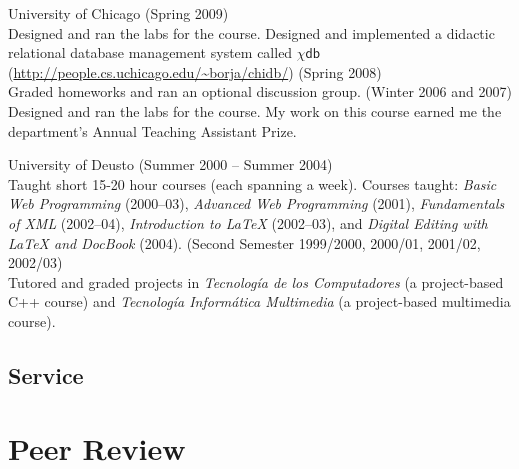 \documentclass{resume}
\begin{document}
\begin{category}{University of Chicago} 
 (Spring 2009)\\
Designed and ran the labs for the course. Designed and implemented a didactic relational database management system called $\chi\textsf{db}$ (\url{http://people.cs.uchicago.edu/~borja/chidb/})
 (Spring 2008)\\
Graded homeworks and ran an optional discussion group.
 (Winter 2006 and 2007)\\
Designed and ran the labs for the course. My work on this course earned me the department's Annual Teaching Assistant Prize.
\end{category}

\begin{category}{University of Deusto} 
 (Summer 2000 -- Summer 2004)\\
Taught short 15-20 hour courses (each spanning a week). Courses taught: \emph{Basic Web Programming} (2000--03), \emph{Advanced Web Programming} (2001), \emph{Fundamentals of XML} (2002--04), \emph{Introduction to \LaTeX} (2002--03), and \emph{Digital Editing with \LaTeX{} and DocBook} (2004).
 (Second Semester 1999/2000, 2000/01, 2001/02, 2002/03)\\
Tutored and graded projects in \emph{Tecnología de los Computadores} (a project-based C++ course) and \emph{Tecnología Informática Multimedia} (a project-based multimedia course).
\end{category}

\pagebreak

\begin{center}
\section*{\huge Service}
\vspace{2ex}
\end{center}

\section*{\hspace{-1cm}Peer Review}
\end{document}
